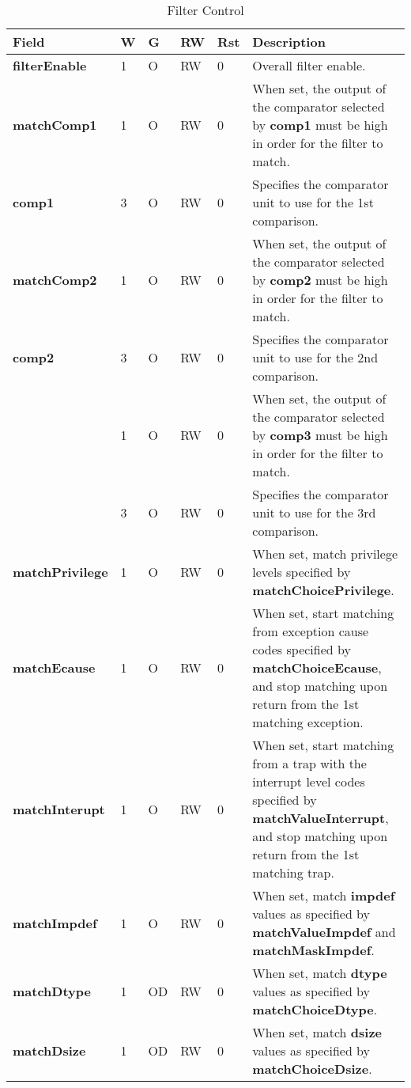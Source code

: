 \begin{table}[htp]
  \centering
  \caption{Filter Control}
  \label{tab:ctl-filter}
  \begin{tabulary}{\textwidth}{|l|l|l|l|l|p{80mm}|}
    \hline
    {\bf Field} & {\bf W} & {\bf G} & {\bf RW} & {\bf Rst} & {\bf Description} \\
    \hline
    \textbf{filterEnable} & 1 & O & RW & 0 & Overall filter enable.\\
    \hline
    \textbf{matchComp1} & 1 & O & RW & 0 & When set, the output of the comparator selected by \textbf{comp1} must be high in order for the filter to match.\\
    \hline
    \textbf{comp1} & 3 & O & RW & 0 & Specifies the comparator unit to use for the 1st comparison.\\
    \hline
    \textbf{matchComp2} & 1 & O & RW & 0 & When set, the output of the comparator selected by \textbf{comp2} must be high in order for the filter to match.\\
    \hline
    \textbf{comp2} & 3 & O & RW & 0 & Specifies the comparator unit to use for the 2nd comparison.\\
    \hline
    \textbf{\color{red}{matchComp3}} & 1 & O & RW & 0 & When set, the output of the comparator selected by \textbf{comp3} must be high in order for the filter to match.\\
    \hline
    \textbf{\color{red}{comp3}} & 3 & O & RW & 0 & Specifies the comparator unit to use for the 3rd comparison.\\
    \hline
    \textbf{matchPrivilege} & 1 & O & RW & 0 & When set, match privilege levels specified by \textbf{matchChoicePrivilege}.\\
    \hline
    \textbf{matchEcause} & 1 & O & RW & 0 & When set, start matching from exception cause codes specified by \textbf{matchChoiceEcause}, 
      and stop matching upon return from the 1st matching exception.\\
    \textbf{matchInterupt} & 1 & O & RW & 0 & When set, start matching from a trap with the interrupt level codes specified by \textbf{matchValueInterrupt}, 
      and stop matching upon return from the 1st matching trap.\\
    \hline
    \textbf{matchImpdef} & 1 & O & RW & 0 & When set, match \textbf{impdef} values as specified by \textbf{matchValueImpdef} and \textbf{matchMaskImpdef}.\\
    \hline
    \textbf{matchDtype} & 1 & OD & RW & 0 & When set, match \textbf{dtype} values as specified by \textbf{matchChoiceDtype}.\\
    \hline
    \textbf{matchDsize} & 1 & OD & RW & 0 & When set, match \textbf{dsize} values as specified by \textbf{matchChoiceDsize}.\\
    \hline
  \end{tabulary}
\end{table}


